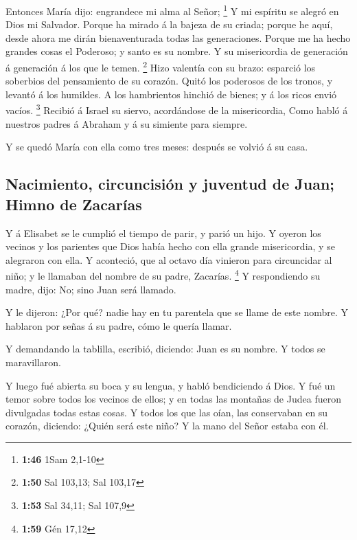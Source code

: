  Entonces María dijo: engrandece mi alma al Señor;
\footnote{\textbf{1:46} 1Sam 2,1-10}  Y mi espíritu se
alegró en Dios mi Salvador.  Porque ha mirado á la bajeza
de su criada; porque he aquí, desde ahora me dirán bienaventurada todas
las generaciones.  Porque me ha hecho grandes cosas el
Poderoso; y santo es su nombre.  Y su misericordia de
generación á generación á los que le temen. \footnote{\textbf{1:50} Sal
  103,13; Sal 103,17}  Hizo valentía con su brazo:
esparció los soberbios del pensamiento de su corazón. 
Quitó los poderosos de los tronos, y levantó á los humildes.
 A los hambrientos hinchió de bienes; y á los ricos envió
vacíos. \footnote{\textbf{1:53} Sal 34,11; Sal 107,9} 
Recibió á Israel su siervo, acordándose de la misericordia,
 Como habló á nuestros padres á Abraham y á su simiente
para siempre.

 Y se quedó María con ella como tres meses: después se
volvió á su casa.

\hypertarget{nacimiento-circuncisiuxf3n-y-juventud-de-juan-himno-de-zacaruxedas}{%
\subsection{Nacimiento, circuncisión y juventud de Juan; Himno de
Zacarías}\label{nacimiento-circuncisiuxf3n-y-juventud-de-juan-himno-de-zacaruxedas}}

 Y á Elisabet se le cumplió el tiempo de parir, y parió
un hijo.  Y oyeron los vecinos y los parientes que Dios
había hecho con ella grande misericordia, y se alegraron con ella.
 Y aconteció, que al octavo día vinieron para circuncidar
al niño; y le llamaban del nombre de su padre, Zacarías. \footnote{\textbf{1:59}
  Gén 17,12}  Y respondiendo su madre, dijo: No; sino
Juan será llamado.

 Y le dijeron: ¿Por qué? nadie hay en tu parentela que se
llame de este nombre.  Y hablaron por señas á su padre,
cómo le quería llamar.

 Y demandando la tablilla, escribió, diciendo: Juan es su
nombre. Y todos se maravillaron.

 Y luego fué abierta su boca y su lengua, y habló
bendiciendo á Dios.  Y fué un temor sobre todos los
vecinos de ellos; y en todas las montañas de Judea fueron divulgadas
todas estas cosas.  Y todos los que las oían, las
conservaban en su corazón, diciendo: ¿Quién será este niño? Y la mano
del Señor estaba con él.

